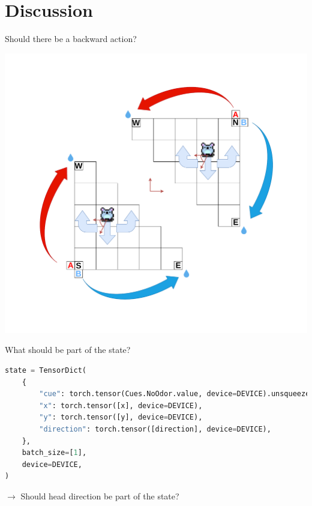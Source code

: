 \documentclass[bigger]{beamer}
\begin{document}
\section{Discussion}
\label{sec:org58cd819}
\begin{frame}[label={sec:org4bc6b62}]{Should there be a backward action?}
\begin{center}
\includegraphics[height=0.8\textheight]{img/RL_env-cartesian-polar.drawio.pdf}
\end{center}
\end{frame}
\begin{frame}[label={sec:org52e0a7b},fragile]{What should be part of the state?}
\scriptsize
\begin{lstlisting}[language={Python}]
state = TensorDict(
    {
        "cue": torch.tensor(Cues.NoOdor.value, device=DEVICE).unsqueeze(-1),
        "x": torch.tensor([x], device=DEVICE),
        "y": torch.tensor([y], device=DEVICE),
        "direction": torch.tensor([direction], device=DEVICE),
    },
    batch_size=[1],
    device=DEVICE,
)
\end{lstlisting}
\normalsize
\(\to\) Should head direction be part of the state?
\end{frame}
\end{document}

